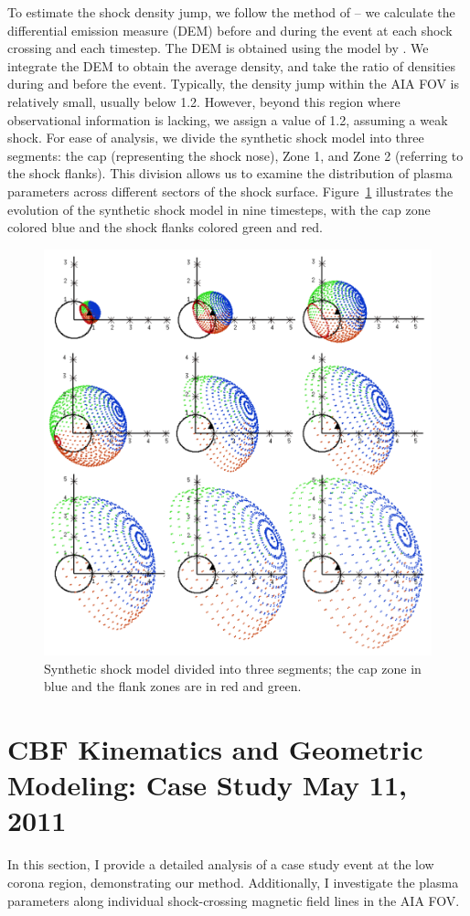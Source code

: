 To estimate the shock density jump, we follow the method of \citet{kozarev_2017} -- we calculate the differential emission measure (DEM) before and during the event at each shock crossing and each timestep. The DEM is obtained using the model by \citet{cheung_2015}. We integrate the DEM to obtain the average density, and take the ratio of densities during and before the event.
Typically, the density jump within the AIA FOV is relatively small, usually below 1.2. However, beyond this region where observational information is lacking, we assign a value of 1.2, assuming a weak shock.
For ease of analysis, we divide the synthetic shock model into three segments: the cap (representing the shock nose), Zone 1, and Zone 2 (referring to the shock flanks). This division allows us to examine the distribution of plasma parameters across different sectors of the shock surface. Figure~\ref{fig_segments} illustrates the evolution of the synthetic shock model in nine timesteps, with the cap zone colored blue and the shock flanks colored green and red.

\begin{figure}[!htp] %
	\centerline{\includegraphics[width=0.7\columnwidth]{chapter2/figs/fig_s2m_segments_geometry.png}}
	\caption{Synthetic shock model divided into three segments; the cap zone in blue and the flank zones are in red and green.}
	\label{fig_segments}
\end{figure}

\section{CBF Kinematics and Geometric Modeling: Case Study May 11, 2011}
In this section, I provide a detailed analysis of a case study event at the low corona region, demonstrating our method. Additionally, I investigate the plasma parameters along individual shock-crossing magnetic field lines in the AIA FOV.

